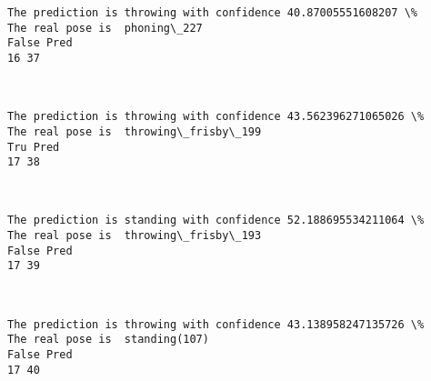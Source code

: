 \documentclass[11pt]{article}
\begin{document}
    \begin{Verbatim}[commandchars=\\\{\}]
The prediction is throwing with confidence 40.87005551608207 \%
The real pose is  phoning\_227
False Pred
16 37

    \end{Verbatim}

    \begin{center}
    \end{center}
    { \hspace*{\fill} \\}
    
    \begin{Verbatim}[commandchars=\\\{\}]
The prediction is throwing with confidence 43.562396271065026 \%
The real pose is  throwing\_frisby\_199
Tru Pred
17 38

    \end{Verbatim}

    \begin{center}
    \end{center}
    { \hspace*{\fill} \\}
    
    \begin{Verbatim}[commandchars=\\\{\}]
The prediction is standing with confidence 52.188695534211064 \%
The real pose is  throwing\_frisby\_193
False Pred
17 39

    \end{Verbatim}

    \begin{center}
    \end{center}
    { \hspace*{\fill} \\}
    
    \begin{Verbatim}[commandchars=\\\{\}]
The prediction is throwing with confidence 43.138958247135726 \%
The real pose is  standing(107)
False Pred
17 40

    \end{Verbatim}

    \begin{center}
    \end{center}
    { \hspace*{\fill} \\}
    
\end{document}
